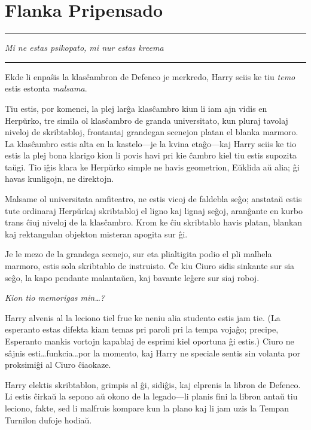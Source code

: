 \chapter{Flanka Pripensado}

\begin{center}\rule{3in}{0.4pt}\end{center}

\emph{Mi ne estas psikopato, mi nur estas kreema}

\begin{center}\rule{3in}{0.4pt}\end{center}

Ekde li enpaŝis la klasĉambron de Defenco je merkredo, Harry sciis ke
tiu \emph{temo} estis estonta \emph{malsama}.

Tiu estis, por komenci, la plej larĝa klasĉambro kiun li iam ajn vidis
en Herpŭrko, tre simila ol klasĉambro de granda universitato, kun
pluraj tavolaj niveloj de skribtabloj, frontantaj grandegan scenejon
platan el blanka marmoro. La klasĉambro estis alta en la kastelo—je la
kvina etaĝo—kaj Harry sciis ke tio estis la plej bona klarigo kion li
povis havi pri kie ĉambro kiel tiu estis supozita taŭgi. Tio iĝis
klara ke Herpŭrko simple ne havis geometrion, Eŭklida aŭ alia; ĝi
havas kunligojn, ne direktojn.

Malsame ol universitata amfiteatro, ne estis vicoj de faldebla seĝo;
anstataŭ estis tute ordinaraj Herpŭrkaj skribtabloj el ligno kaj
lignaj seĝoj, aranĝante en kurbo trans ĉiuj niveloj de la
klasĉambro. Krom ke ĉiu skribtablo havis platan, blankan kaj
rektangulan objekton misteran apogita sur ĝi.

Je le mezo de la grandega scenejo, sur eta plialtigita podio el pli
malhela marmoro, estis sola skribtablo de instruisto. Ĉe kiu Ciuro
sidis sinkante sur sia seĝo, la kapo pendante malantaŭen, kaj bavante
leĝere sur siaj roboj.

\emph{Kion tio memorigas min\ldots?}

Harry alvenis al la leciono tiel frue ke neniu alia studento estis
jam tie. (La esperanto estas difekta kiam temas pri paroli pri la
tempa vojaĝo; precipe, Esperanto mankis vortojn kapablaj de esprimi
kiel oportuna ĝi estis.) Ciuro ne sâjnis esti\ldots funkcia\ldots por
la momento, kaj Harry ne speciale sentis sin volanta por proksimiĝi
al Ciuro ĉiaokaze.

Harry elektis skribtablon, grimpis al ĝi, sidiĝis, kaj elprenis la
libron de Defenco. Li estis ĉirkaŭ la sepono aŭ okono de la legado—li
planis fini la libron antaŭ tiu leciono, fakte, sed li malfruis
kompare kun la plano kaj li jam uzis la Tempan Turnilon dufoje hodiaŭ.

